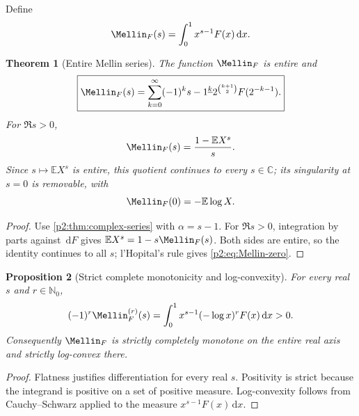 \documentclass[11pt,oneside]{article}
\newtheorem{theorem}{Theorem}[section]
\newtheorem{proposition}[theorem]{Proposition}
\theoremstyle{definition}
\theoremstyle{remark}
\newcommand{\E}{\mathbb E}
\newcommand{\C}{\mathbb C}
\newcommand{\N}{\mathbb N}
\newcommand{\dd}{\,\mathrm d}
\newcommand{\fall}[2]{#1^{\underline{#2}}}
\newcommand{\1}{\mathbf 1}
\begin{document}
Define
\begin{equation}
 \Mellin_F(s)=\int_0^1x^{s-1}F(x)\dd x.                   \label{p2:eq:Mellin-def}
\end{equation}

\begin{theorem}[Entire Mellin series]
\label{p2:thm:mellin-entire}
The function $\Mellin_F$ is entire and
\begin{equation}
 \boxed{
 \Mellin_F(s)=\sum_{k=0}^{\infty}(-1)^k\fall{s-1}{k}
 2^{\binom{k+1}{2}}F(2^{-k-1}).}                          \label{p2:eq:Mellin-series}
\end{equation}
For $\Re s>0$,
\begin{equation}
 \Mellin_F(s)=\frac{1-\E X^s}{s}.                        \label{p2:eq:Mellin-prob}
\end{equation}
Since $s\mapsto\E X^s$ is entire, this quotient continues to every
$s\in\C$; its singularity at $s=0$ is removable, with
\begin{equation}
 \Mellin_F(0)=-\E\log X.                                 \label{p2:eq:Mellin-zero}
\end{equation}
\end{theorem}

\begin{proof}
Use \cref{p2:thm:complex-series} with $\alpha=s-1$.  For $\Re s>0$, integration
by parts against $\dd F$ gives
$\E X^s=1-s\Mellin_F(s)$.  Both sides are entire, so the identity
continues to all $s$; l'Hopital's rule gives \eqref{p2:eq:Mellin-zero}.
\end{proof}

\begin{proposition}[Strict complete monotonicity and log-convexity]
\label{p2:prop:mellin-cm}
For every real $s$ and $r\in\N_0$,
\begin{equation}
 (-1)^r\Mellin_F^{(r)}(s)
 =\int_0^1x^{s-1}(-\log x)^rF(x)\dd x>0.                  \label{p2:eq:Mellin-cm}
\end{equation}
Consequently $\Mellin_F$ is strictly completely monotone on the entire real
axis and strictly log-convex there.
\end{proposition}

\begin{proof}
Flatness justifies differentiation for every real $s$.  Positivity is strict
because the integrand is positive on a set of positive measure.  Log-convexity
follows from Cauchy--Schwarz applied to the measure
$x^{s-1}F(x)\dd x$.
\end{proof}
\end{document}
